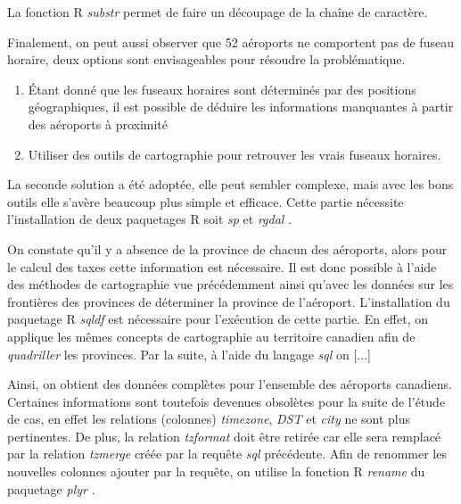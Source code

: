 %
%
La fonction R \textit{substr} \cite{Rfunction:substr} permet de faire un découpage de la chaîne de caractère.

Finalement, on peut aussi observer que 52 aéroports ne comportent pas de fuseau horaire, deux options sont envisageables pour résoudre la problématique.

\begin{enumerate}
\item Étant donné que les fuseaux horaires sont déterminés par des positions géographiques, il est possible de déduire les informations manquantes à partir des aéroports à proximité
\item Utiliser des outils de cartographie pour retrouver les vrais fuseaux horaires.
\end{enumerate}

La seconde solution a été adoptée, elle peut sembler complexe, mais avec les bons outils elle s'avère beaucoup plus simple et efficace. Cette partie nécessite l'installation de deux paquetages R soit \textit{sp} \cite{Rpackage:sp} et \textit{rgdal} \cite{Rpackage:rgdal}.


%
%


%
%
On constate qu'il y a absence de la province de chacun des aéroports, alors pour le calcul des taxes cette information est nécessaire. Il est donc possible à l'aide des méthodes de cartographie vue précédemment ainsi qu'avec les données sur les frontières des provinces \cite{Data:BoundaryFiles} de déterminer la province de l'aéroport. L'installation du paquetage R \textit{sqldf} \cite{Rpackage:sqldf} est nécessaire pour l'exécution de cette partie. En effet, on applique les mêmes concepts de cartographie au territoire canadien afin de \emph{quadriller} les provinces. Par la suite, à l'aide du langage \emph{sql} \cite{Language:sql} on [...] %

Ainsi, on obtient des données complètes pour l'ensemble des aéroports canadiens. Certaines informations sont toutefois devenues obsolètes pour la suite de l'étude de cas, en effet les relations (colonnes) \textit{ timezone}, \textit{DST} et \textit{city} ne sont plus pertinentes. De plus, la relation \textit{ tzformat} doit être retirée car elle sera remplacé par la relation \textit{tzmerge} créée par la requête \textit{sql} précédente. Afin de renommer les nouvelles colonnes ajouter par la requête, on utilise la fonction R \textit{rename} \cite{Rfunction:rename,} du paquetage \textit{plyr} \cite{Rpackage:plyr}.

